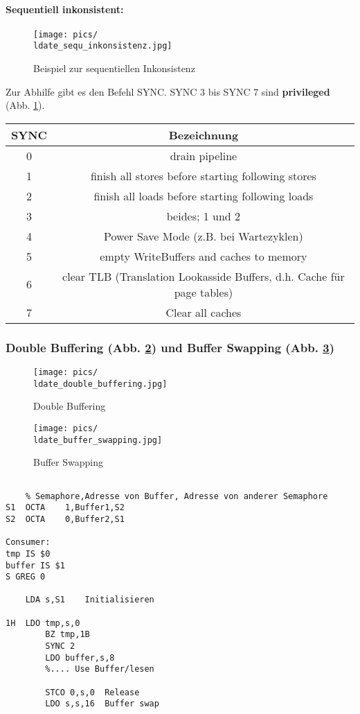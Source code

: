 \paragraph{Sequentiell inkonsistent:} 

\begin{figure}[htbp]
\texttt{[image: pics/\\ldate\_sequ\_inkonsistenz.jpg]}
\caption{Beispiel zur sequentiellen Inkonsistenz}
\label{fig:sequ_inkonsistenz}
\end{figure}

Zur Abhilfe gibt es den Befehl SYNC. SYNC 3 bis SYNC 7 sind \textbf{privileged} (Abb. \ref{fig:sequ_inkonsistenz}). 

\begin{tabular}{|c|c|}
\hline SYNC & Bezeichnung \\ 
\hline 0 & drain pipeline \\ 
\hline 1 & finish all stores before starting following stores \\ 
\hline 2 & finish all loads before starting following loads \\ 
\hline 3 & beides; 1 und 2 \\ 
\hline 4 & Power Save Mode (z.B. bei Wartezyklen) \\ 
\hline 5 & empty WriteBuffers and caches to memory \\ 
\hline 6 & clear TLB (Translation Lookasside Buffers, d.h. Cache für page tables) \\ 
\hline 7 & Clear all caches \\ 
\hline 
\end{tabular} 

\subsubsection{Double Buffering (Abb. \ref{fig:double_buffering}) und Buffer Swapping (Abb. \ref{fig:buffer_swapping})}

\begin{figure}[htbp]
\texttt{[image: pics/\\ldate\_double\_buffering.jpg]}
\caption{Double Buffering}
\label{fig:double_buffering}
\end{figure}

\begin{figure}[htbp]
\texttt{[image: pics/\\ldate\_buffer\_swapping.jpg]}
\caption{Buffer Swapping}
\label{fig:buffer_swapping}
\end{figure}

\begin{lstlisting}

	% Semaphore,Adresse von Buffer, Adresse von anderer Semaphore
S1	OCTA 	1,Buffer1,S2
S2	OCTA 	0,Buffer2,S1

Consumer:
tmp IS $0
buffer IS $1
S GREG 0

	LDA s,S1	Initialisieren

1H	LDO tmp,s,0
		BZ tmp,1B
		SYNC 2
		LDO buffer,s,8
		%.... Use Buffer/lesen
	
		STCO 0,s,0	Release
		LDO s,s,16	Buffer swap
\end{lstlisting}


